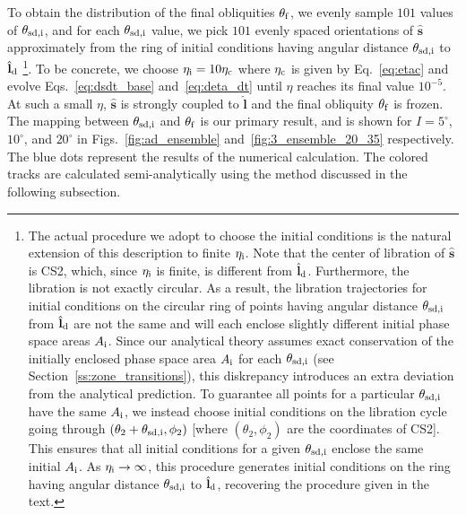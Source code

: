 \documentclass[twocolumn,twocolappendix]{aastex63}
\newcommand*{\bsmb}[1]{\boldsymbol{\mathbf{#1}}}
\newcommand*{\uv}[1]{\hat{\bsmb{#1}}}
\newcommand*{\p}[1]{\left(#1\right)}
\begin{document}
To obtain the distribution of the final obliquities $\theta_{\rm f}$, we evenly
sample $101$ values of $\theta_{\rm sd, i}$, and for each $\theta_{\rm sd, i}$
value, we pick $101$ evenly spaced orientations of $\uv{s}$ approximately from
the ring of initial conditions having angular distance $\theta_{\rm sd, i}$ to
$\uv{l}_{\rm d}$%
%
\footnote{The actual procedure we adopt to choose the initial conditions is the
natural extension of this description to finite $\eta_{\rm i}$. Note that the
center of libration of $\uv{s}$ is CS2, which, since $\eta_{\rm i}$ is finite,
is different from $\uv{l}_{\rm d}$. Furthermore, the libration is not exactly
circular. As a result, the libration trajectories for initial conditions on the
circular ring of points having angular distance $\theta_{\rm sd, i}$ from
$\uv{l}_{\rm d}$ are not the same and will each enclose slightly different
initial phase space areas $A_{\rm i}$. Since our analytical theory assumes exact
conservation of the initially enclosed phase space area $A_{\rm i}$ for each
$\theta_{\rm sd, i}$ (see Section~\ref{ss:zone_transitions}), this diskrepancy
introduces an extra deviation from the analytical prediction. To guarantee all
points for a particular $\theta_{\rm sd, i}$ have the same $A_{\rm i}$, we
instead choose initial conditions on the libration cycle going through
$\p{\theta_2 + \theta_{\rm sd, i}, \phi_2}$ [where $\p{\theta_2, \phi_2}$ are
the coordinates of CS2]. This ensures that all initial conditions for a given
$\theta_{\rm sd, i}$ enclose the same initial $A_{\rm i}$. As $\eta_{\rm i} \to
\infty$, this procedure generates initial conditions on the ring having angular
distance $\theta_{\rm sd, i}$ to $\uv{l}_{\rm d}$, recovering the procedure
given in the text.}.
%
To be concrete, we choose $\eta_{\rm i} = 10\eta_{\rm c}$ where $\eta_{\rm c}$
is given by Eq.~\eqref{eq:etac} and evolve Eqs.~\eqref{eq:dsdt_base}
and~\eqref{eq:deta_dt} until $\eta$ reaches its final value $10^{-5}$. At such a
small $\eta$, $\uv{s}$ is strongly coupled to $\uv{l}$ and the final obliquity
$\theta_{\rm f}$ is frozen. The mapping between $\theta_{\rm sd, i}$ and
$\theta_{\rm f}$ is our primary result, and is shown for $I = 5^\circ$,
$10^\circ$, and $20^\circ$ in Figs.~\ref{fig:ad_ensemble}
and~\ref{fig:3_ensemble_20_35} respectively. The blue dots represent the results
of the numerical calculation. The colored tracks are calculated
semi-analytically using the method discussed in the following subsection.
\end{document}
